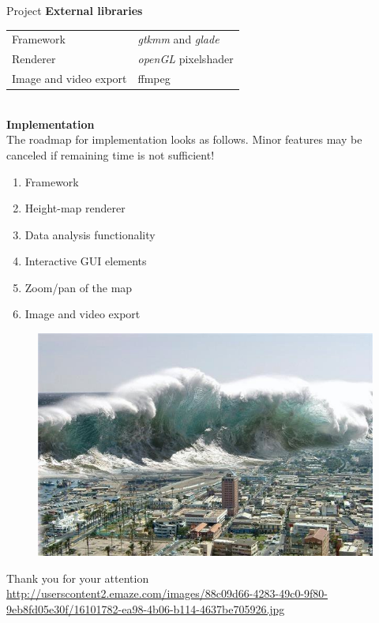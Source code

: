 \documentclass[shortpres,usenames,dvipsnames]{beamer}
\newcommand{\imgfullscale}{0.75}
\begin{document}
\begin{frame}{Project}
	\textbf{External libraries}\\\vspace{5pt}
	\begin{tabular}{ll}
		Framework & \textit{gtkmm} and \textit{glade}\\
		Renderer & \textit{openGL} pixelshader\\
		Image and video export & ffmpeg
	\end{tabular}
	\\\vspace{5pt}
	\textbf{Implementation}\\
	The roadmap for implementation looks as follows. Minor features may be canceled if remaining time is not sufficient!
	\begin{enumerate}
		\item Framework
		\item Height-map renderer
		\item Data analysis functionality
		\item Interactive GUI elements
		\item Zoom/pan of the map
		\item Image and video export
	\end{enumerate}
	
\end{frame}

\begin{frame}{}
	\begin{figure}
		\includegraphics[clip, width=\imgfullscale\linewidth]{img/tsunami.jpg}
	\end{figure}
	\centering
	\vspace{10pt}
	Thank you for your attention
	\\
	\vfill
	\flushleft
	{\fontsize{5}{5} \selectfont \url{http://userscontent2.emaze.com/images/88c09d66-4283-49c0-9f80-9eb8fd05e30f/16101782-ea98-4b06-b114-4637be705926.jpg}}
\end{frame}
	
\end{document}
